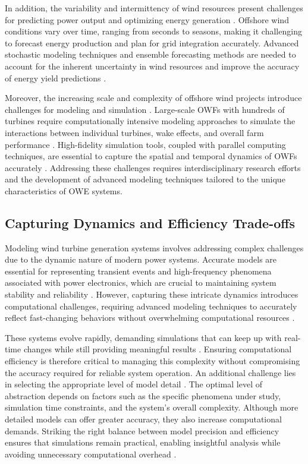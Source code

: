 \documentclass{ieeeaccess}
\begin{document}
In addition, the variability and intermittency of wind resources present challenges for predicting power output and optimizing energy generation \cite{sulaeman2016wind}. Offshore wind conditions vary over time, ranging from seconds to seasons, making it challenging to forecast energy production and plan for grid integration accurately. Advanced stochastic modeling techniques and ensemble forecasting methods are needed to account for the inherent uncertainty in wind resources and improve the accuracy of energy yield predictions \cite{arenas2020stochastic, gong2024improving, hoang2023probabilistic}.

Moreover, the increasing scale and complexity of offshore wind projects introduce challenges for modeling and simulation \cite{yoro2021update}. Large-scale OWFs with hundreds of turbines require computationally intensive modeling approaches to simulate the interactions between individual turbines, wake effects, and overall farm performance \cite{wu2019key}. High-fidelity simulation tools, coupled with parallel computing techniques, are essential to capture the spatial and temporal dynamics of OWFs accurately \cite{zou2023modeling, nomandela2023modeling}. Addressing these challenges requires interdisciplinary research efforts and the development of advanced modeling techniques tailored to the unique characteristics of OWE systems.


\subsection{\textbf{Capturing Dynamics and Efficiency Trade-offs}}

Modeling wind turbine generation systems involves addressing complex challenges due to the dynamic nature of modern power systems. Accurate models are essential for representing transient events and high-frequency phenomena associated with power electronics, which are crucial to maintaining system stability and reliability \cite{zhang2016review}. However, capturing these intricate dynamics introduces computational challenges, requiring advanced modeling techniques to accurately reflect fast-changing behaviors without overwhelming computational resources \cite{karaagac2016offshore}.

These systems evolve rapidly, demanding simulations that can keep up with real-time changes while still providing meaningful results \cite{ganesh2021generic}. Ensuring computational efficiency is therefore critical to managing this complexity without compromising the accuracy required for reliable system operation. An additional challenge lies in selecting the appropriate level of model detail \cite{zou2023integrated}. The optimal level of abstraction depends on factors such as the specific phenomena under study, simulation time constraints, and the system's overall complexity. Although more detailed models can offer greater accuracy, they also increase computational demands. Striking the right balance between model precision and efficiency ensures that simulations remain practical, enabling insightful analysis while avoiding unnecessary computational overhead \cite{xia2023operation}.
\end{document}

